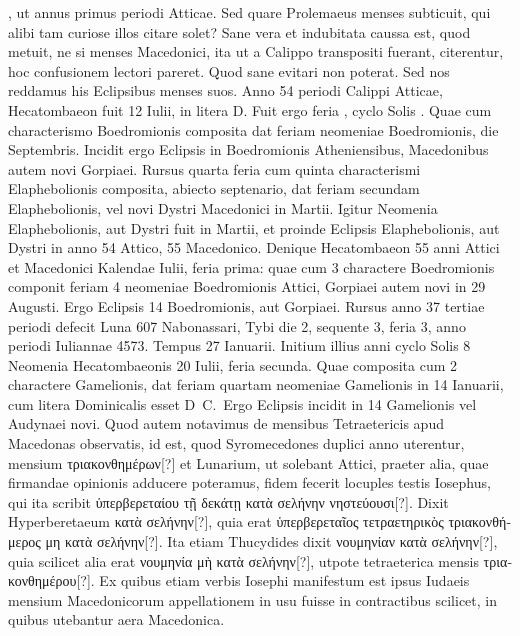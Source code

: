 , ut annus primus periodi Atticae.
Sed quare Prolemaeus menses
subticuit, qui alibi tam curiose illos citare solet?
Sane vera et indubitata
caussa est, quod metuit, ne si menses Macedonici, ita ut a Calippo
transpositi fuerant, citerentur, hoc confusionem lectori pareret.
%
Quod
sane evitari non poterat.
Sed nos reddamus his Eclipsibus menses suos.
Anno 54 periodi Calippi Atticae, Hecatombaeon fuit 12 Iulii, in litera
D.
Fuit ergo feria , cyclo Solis .
Quae cum characterismo Boedromionis
composita dat feriam  neomeniae Boedromionis,
 die  Septembris.
Incidit ergo Eclipsis in  Boedromionis Atheniensibus,
Macedonibus autem novi Gorpiaei.
Rursus quarta feria cum quinta characterismi
Elaphebolionis composita, abiecto septenario, dat feriam
secundam Elaphebolionis, vel novi Dystri Macedonici in  Martii.
Igitur
Neomenia Elaphebolionis, aut Dystri fuit in  Martii, et proinde
Eclipsis  Elaphebolionis, aut Dystri in anno 54 Attico, 55
Macedonico.
Denique Hecatombaeon 55 anni Attici et Macedonici Kalendae
Iulii, feria prima: quae cum 3 charactere Boedromionis componit
feriam 4 neomeniae Boedromionis Attici, Gorpiaei autem novi in
29 Augusti.
Ergo Eclipsis 14 Boedromionis, aut Gorpiaei.
Rursus anno
37 tertiae periodi defecit Luna 607 Nabonassari, Tybi die 2, sequente
3, feria 3, anno periodi Iuliannae 4573.
Tempus 27 Ianuarii.
Initium
illius anni cyclo Solis 8 Neomenia Hecatombaeonis 20 Iulii, feria
secunda.
Quae composita cum 2 charactere Gamelionis, dat feriam quartam
neomeniae Gamelionis in 14 Ianuarii, cum litera Dominicalis esset
D~C.\ 
Ergo Eclipsis incidit in 14 Gamelionis vel Audynaei novi.
\lnr{24}Quod autem notavimus de mensibus Tetraetericis apud Macedonas
observatis, id est, quod Syromecedones duplici anno uterentur, mensium
\textgreek{τριακονθημέρων[?]}
 et Lunarium, ut solebant Attici, praeter alia, quae firmandae
opinionis adducere poteramus, fidem fecerit locuples testis Iosephus,
qui ita scribit
 \textgreek{ὑπερβερεταίου τῇ δεκάτῃ κατὰ σελήνην νηστεύουσι[?]}.
\lnr{27}Dixit Hyperberetaeum
\textgreek{κατὰ σελήνην[?]}, quia erat
 \textgreek{ὑπερβερεταῖος τετραετηρικὸς τριακονθήμερος
μη κατὰ σελήνην[?]}.
Ita etiam Thucydides dixit \textgreek{νουμηνίαν κατὰ σελήνην[?]},
quia scilicet alia erat \textgreek{νουμηνία μὴ κατὰ σελήνην[?]},
 utpote tetraeterica mensis
\textgreek{τριακονθημέρου[?]}.
Ex quibus etiam verbis Iosephi manifestum est ipsus Iudaeis
mensium Macedonicorum appellationem in usu fuisse in contractibus
scilicet, in quibus utebantur aera Macedonica.
%
